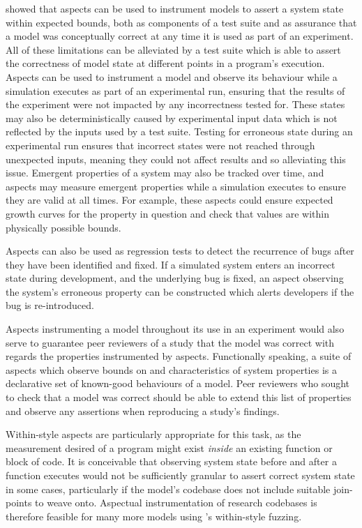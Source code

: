  showed that aspects can
be used to instrument models to assert a system state within expected bounds,
both as components of a test suite and as assurance that a model was
conceptually correct at any time it is used as part of an experiment. All of
these limitations can be alleviated by a test suite which is able to assert the
correctness of model state at different points in a program's execution. Aspects
can be used to instrument a model and observe its behaviour while a simulation
executes as part of an experimental run, ensuring that the results of the
experiment were not impacted by any incorrectness tested for. These states may
also be deterministically caused by experimental input data which is not
reflected by the inputs used by a test suite. Testing for erroneous state during
an experimental run ensures that incorrect states were not reached through
unexpected inputs, meaning they could not affect results and so alleviating this
issue. Emergent properties of a system may also be tracked over time, and
aspects may measure emergent properties while a simulation executes to ensure
they are valid at all times. For example, these aspects could ensure expected
growth curves for the property in question and check that values are within
physically possible bounds.

Aspects can also be used as regression tests to detect the recurrence of bugs
after they have been identified and fixed. If a simulated system enters an
incorrect state during development, and the underlying bug is fixed, an aspect
observing the system's erroneous property can be constructed which alerts
developers if the bug is re-introduced.

Aspects instrumenting a model throughout its use in an experiment would also
serve to guarantee peer reviewers of a study that the model was correct with
regards the properties instrumented by aspects. Functionally speaking, a suite
of aspects which observe bounds on and characteristics of system properties is a
declarative set of known-good behaviours of a model. Peer reviewers who sought
to check that a model was correct should be able to extend this list of
properties and observe any assertions when reproducing a study's findings.

Within-style aspects are particularly appropriate for this task, as the
measurement desired of a program might exist \emph{inside} an existing function or
block of code. It is conceivable that observing system state before and after a
function executes would not be sufficiently granular to assert correct system
state in some cases, particularly if the model's codebase does not include
suitable join-points to weave onto. Aspectual instrumentation of research codebases is
therefore feasible for many more models using \pdsf{}'s within-style fuzzing.

